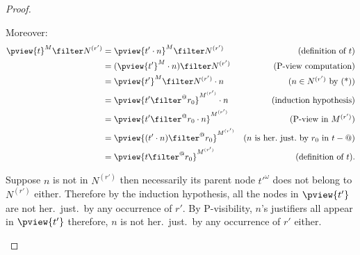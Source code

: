 \begin{proof}
\begin{itemize}
\begin{itemize}
    Moreover:
        \begin{align*}
        \pview{t}^M \filter N^{(r')}
    &= \pview{t' \cdot n}^M \filter  N^{(r')} & (\mbox{definition of } t)\\
            &= (\pview{t'}^M \cdot n) \filter  N^{(r')}  & (\mbox{P-view computation}) \\
            &= \pview{t'}^M \filter  N^{(r')}  \cdot n             & (\mbox{$n\in N^{(r')}$ by (*)}) \\
            &= \pview{t' \filter^@  r_0 }^{M^{(r')}} \cdot n            & (\mbox{induction hypothesis}) \\
            &= \pview{t' \filter^@  r_0 \cdot n }^{M^{(r')}} & (\mbox{P-view in $M^{(r')}$}) \\
            &= \pview{(t' \cdot n ) \filter^@  r_0  }^{M^{(r')}}           & (\mbox{$n$ is her.\ just.\ by $r_0$ in $t-@$}) \\
            &= \pview{t \filter^@  r_0  }^{M^{(r')}}
     & (\mbox{definition of } t).
        \end{align*}

    Suppose $n$ is not in $N^{(r')}$ then necessarily its parent node $t'^\omega$ does not belong to $N^{(r')}$ either.
    Therefore by the induction hypothesis, all the nodes in $\pview{t'}$ are not her.\ just.\ by any occurrence
    of $r'$. By P-visibility, $n$'s justifiers all appear in $\pview{t'}$ therefore, $n$ is not her.\ just.\ by any occurrence of $r'$ either.




\end{itemize}
\end{itemize}
\end{proof}
